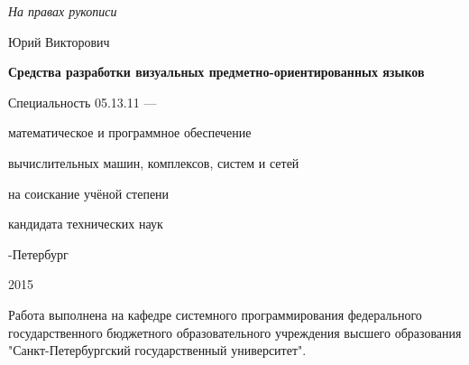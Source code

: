 \newcommand{\sfs}{\fontsize{12pt}{12pt}\selectfont}
\sfs %
\thispagestyle{empty}

\vspace{10mm}
\begin{flushright}
  \Large\textit{На правах рукописи}
\end{flushright}

\vspace{25mm}
\begin{center}
{\Large{} Юрий Викторович}
\end{center}

\vspace{20mm}
\begin{center}
{\bf \LARGE Средства разработки визуальных предметно-ориентированных языков
\par}

\vspace{20mm}
{\Large
Специальность 05.13.11 ---\par
математическое и программное обеспечение\par
вычислительных машин, комплексов, систем и сетей
}

\vspace{15mm}
\par
{} на соискание учёной степени\par
кандидата технических наук
\end{center}

\vspace{35mm}
\begin{center}
{-Петербург\par 2015}
\end{center}

\newpage
\thispagestyle{empty}

\small{
Работа выполнена на кафедре системного программирования федерального государственного
бюджетного образовательного учреждения высшего образования "Санкт-Петербургский
государственный университет".
}

